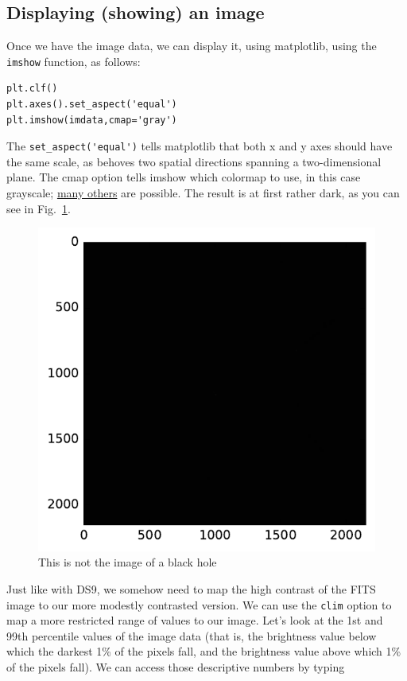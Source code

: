 \documentclass[twocolumn,apj]{openjournal}
\begin{document}
\subsection{Displaying (showing) an image}
\label{MatplotlibDisplayImage}
Once we have the image data, we can display it, using matplotlib, using the \verb|imshow| function, as follows:
\begin{lstlisting}
plt.clf()
plt.axes().set_aspect('equal')
plt.imshow(imdata,cmap='gray')
\end{lstlisting}
The \verb|set_aspect('equal')| tells matplotlib that both x and y axes should have the same scale, as behoves two spatial directions spanning a two-dimensional plane. The cmap option tells imshow which colormap to use, in this case grayscale; \href{https://matplotlib.org/examples/color/colormaps_reference.html}{many others} are possible. 
The result is at first rather dark, as you can see in Fig.~\ref{ImshowDark}.
\begin{figure}[htbp]
\begin{center}
\includegraphics[width=\linewidth]{m16-blue.pdf}
\caption{This is not the image of a black hole}
\label{ImshowDark}
\end{center}
\end{figure}
Just like with DS9, we somehow need to map the high contrast of the FITS image to our more modestly contrasted version. We can use the \verb|clim| option to map a more restricted range of values to our image. Let's look at the 1st and 99th percentile values of the image data (that is, the brightness value below which the darkest 1\% of the pixels fall, and the brightness value above which 1\% of the pixels fall). We can access those descriptive numbers by typing
\end{document}
